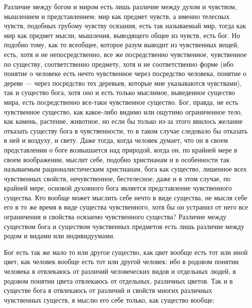 \documentclass[12pt]{article}
\begin{document}
Различие между богом и миром есть лишь различие между духом и чувством, мышлением и представлением; мир как предмет чувств, а именно телесных чувств, подобных грубому чувству осязания, есть так называемый мир, тогда как мир как предмет мысли, мышления, выводящего общее из чувств, есть бог. Но подобно тому, как то всеобщее, которое разум выводит из чувственных вещей, есть, хотя и не непосредственно, все же посредственно чувственное, чувственное по существу, соответственно предмету, хотя и не соответственно форме (ибо понятие о человеке есть нечто чувственное через посредство человека, понятие о дереве --- через посредство тех деревьев, которые мне указываются чувствами), так и существо бога, хотя оно и есть только мыслимое, выведенное существо мира, есть посредственно все-таки чувственное существо. Бог, правда, не есть чувственное существо, как какое-либо видимо или ощутимо ограниченное тело, как камень, растение, животное, но если бы только из-за этого явилось желание отказать существу бога в чувственности, то в таком случае следовало бы отказать в ней и воздуху, и свету. Даже тогда, когда человек думает, что он в своем представлении о боге возвышается над природой, когда он, по крайней мере в своем воображении, мыслит себе, подобно христианам и в особенности так называемым рационалистическим христианам, бога как существо, лишенное всех чувственных свойств, нечувственное, бестелесное; даже и в этом случае, по крайней мере, основой духовного бога является представление чувственного существа. Кто вообще может мыслить себе нечто в виде существа, не мысля себе его в то же время в виде существа чувственного, хотя бы он устранил от него все ограничения и свойства осязаемо чувственного существа? Различие между существом бога и существом чувственных предметов есть лишь различие между родом и видами или индивидуумами. 

Бог есть так же мало то или другое существо, как цвет вообще есть тот или иной цвет, как человек вообще есть тот или другой человек: ибо в родовом понятии человека я отвлекаюсь от различий человеческих видов и отдельных людей, в родовом понятии цвета отвлекаюсь от отдельных, различных цветов. Так и в существе бога я отвлекаюсь от различий и свойств многих различных чувственных существ, я мыслю его себе только, как существо вообще; 
\end{document}
